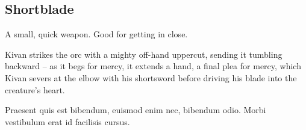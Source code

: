 \subsection{Shortblade}

A small, quick weapon. Good for getting in close.

\begin{quotebox}
  Kivan strikes the orc with a mighty off-hand uppercut, sending it tumbling backward -- as it begs for mercy, it extends a hand, a final plea
  for mercy, which Kivan severs at the elbow with his shortsword before driving his blade into the creature's heart.
\end{quotebox}

\begin{quotebox}
Praesent quis est bibendum, euismod enim nec, bibendum odio. Morbi vestibulum erat id facilisis cursus.
\end{quotebox}
